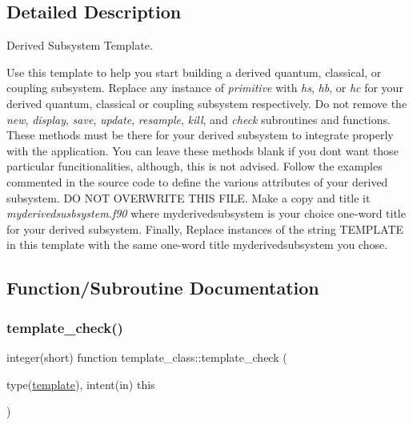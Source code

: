 \subsection{Detailed Description}
Derived Subsystem Template. 

Use this template to help you start building a derived quantum, classical, or coupling subsystem. Replace any instance of {\itshape primitive} with {\itshape hs}, {\itshape hb}, or {\itshape hc} for your derived quantum, classical or coupling subsystem respectively. Do not remove the {\itshape new}, {\itshape display}, {\itshape save}, {\itshape update}, {\itshape resample}, {\itshape kill}, and {\itshape check} subroutines and functions. These methods must be there for your derived subsystem to integrate properly with the application. You can leave these methods blank if you dont want those particular funcitionalities, although, this is not advised. Follow the examples commented in the source code to define the various attributes of your derived subsystem. DO N\+OT O\+V\+E\+R\+W\+R\+I\+TE T\+H\+IS F\+I\+LE. Make a copy and title it {\itshape myderivedsusbsystem.\+f90} where \textquotesingle{}myderivedsubsystem\textquotesingle{} is your choice one-\/word title for your derived subsystem. Finally, Replace instances of the string \textquotesingle{}T\+E\+M\+P\+L\+A\+TE\textquotesingle{} in this template with the same one-\/word title \textquotesingle{}myderivedsubsystem\textquotesingle{} you chose. 

\subsection{Function/\+Subroutine Documentation}
\mbox{\label{namespacetemplate__class_a61fa7b21db4be16f8d32b67df5b9463c}} 
\subsubsection{\texorpdfstring{template\+\_\+check()}{template\_check()}}
{\footnotesize\ttfamily integer(short) function template\+\_\+class\+::template\+\_\+check (\begin{DoxyParamCaption}\item[{type(\hyperlink{structtemplate__class_1_1template}{template}), intent(in)}]{this }\end{DoxyParamCaption})\hspace{0.3cm}{\ttfamily [private]}}




